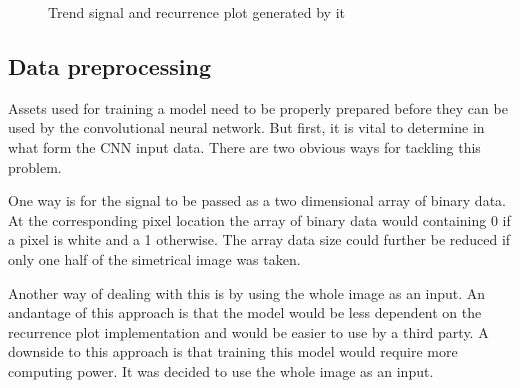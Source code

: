 \documentclass[a4paper,12pt,fleqn]{article}
\begin{document}
\begin{figure}
  \centering
  \qquad
  \caption{Trend signal and recurrence plot generated by it}
  \label{fig:generated_trend}
\end{figure}


\subsection{Data preprocessing}
Assets used for training a model need to be properly prepared before they can be used by the convolutional neural network.
But first, it is vital to determine in what form the CNN input data.
There are two obvious ways for tackling this problem.

One way is for the signal to be passed as a two dimensional array of binary data.
At the corresponding pixel location the array of binary data would containing 0 if a pixel is white and a 1 otherwise.
The array data size could further be reduced if only one half of the simetrical image was taken.

Another way of dealing with this is by using the whole image as an input.
An andantage of this approach is that the model would be less dependent on the recurrence plot implementation and would be easier to use by a third party.
A downside to this approach is that training this model would require more computing power. It was decided to use the whole image as an input.
\end{document}
